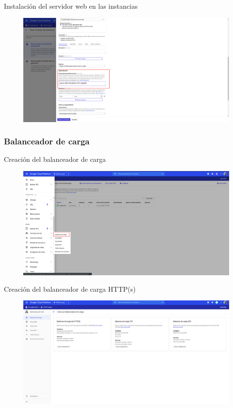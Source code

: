 \documentclass{beamer}
\begin{document}
\begin{frame}[fragile]{Instalación del servidor web en las instancias}
  \begin{figure}[H]
		\centering
		\includegraphics[width=\textwidth]{project/automation.png}
	\end{figure}
\end{frame}

\subsubsection{Balanceador de carga}


\begin{frame}[fragile]{Creación del balanceador de carga}
  \begin{figure}[H]
		\centering
		\includegraphics[width=\textwidth]{project/loadbalancer.png}
	\end{figure}
\end{frame}

\begin{frame}[fragile]{Creación del balanceador de carga HTTP(s)}
  \begin{figure}[H]
		\centering
		\includegraphics[width=\textwidth]{project/loadbalancerhttps.png}
	\end{figure}
\end{frame}
\end{document}
